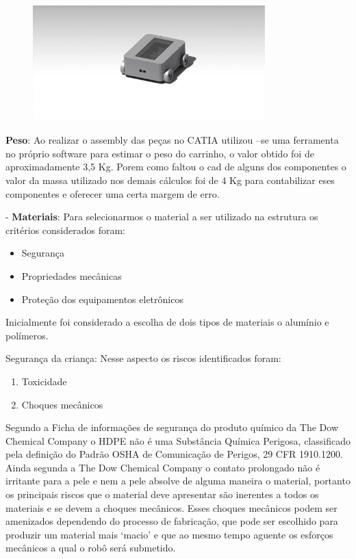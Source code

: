 \begin{figure}[H]
    \centering
    \includegraphics[width=0.8\textwidth]{figuras/estrutura_catia.eps}
    \caption{}
    \label{fig:catia01}
\end{figure}

\textbf{Peso}: Ao realizar o assembly das peças no CATIA utilizou –se uma ferramenta no próprio software para estimar o peso do carrinho,
o valor obtido foi de aproximadamente 3,5 Kg. Porem como faltou o cad de alguns dos componentes o valor da massa utilizado nos demais
cálculos foi de 4 Kg para contabilizar eses componentes e oferecer uma certa margem de erro.


- \textbf{Materiais}:
Para selecionarmos o material a ser utilizado na estrutura os critérios considerados foram:
\begin{itemize}
\item Segurança
\item Propriedades mecânicas
\item Proteção dos equipamentos eletrônicos
\end{itemize}

Inicialmente foi considerado a escolha de dois tipos de materiais o alumínio e polímeros.
 
Segurança da criança: Nesse aspecto os riscos identificados foram:
\begin{enumerate}
\item Toxicidade
\item Choques mecânicos
\end{enumerate}

Segundo a Ficha de informações de segurança do produto químico da The Dow Chemical Company o HDPE não é uma Substância Química Perigosa,
classificado pela definição do Padrão OSHA de Comunicação de Perigos, 29 CFR 1910.1200. Ainda segunda a The Dow Chemical Company o contato
prolongado não é irritante para a pele e nem a pele absolve de alguma maneira o material, portanto os principais riscos que o material
deve apresentar são inerentes a todos os materiais e se devem a choques mecânicos. Esses choques mecânicos podem ser amenizados dependendo
do processo de fabricação, que pode ser escolhido para produzir um material mais ‘macio’ e que ao mesmo tempo aguente os esforços
mecânicos a qual o robô será submetido.

